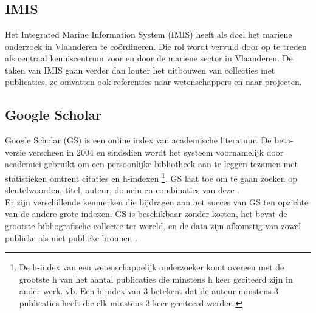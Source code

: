 \chapter{}%
\label{ch:stand-van-zaken}


\section{IMIS}
Het Integrated Marine Information System (IMIS) \autocite{Haspeslagh2024} heeft als doel het mariene onderzoek in Vlaanderen te coördineren. Die rol wordt vervuld door op te treden als centraal kenniscentrum voor en door de mariene sector in Vlaanderen. De taken van IMIS gaan verder dan louter het uitbouwen van collecties met publicaties, ze omvatten ook referenties naar wetenschappers en naar projecten.
\section{Google Scholar}
Google Scholar (GS) is een online index van academische literatuur. De beta-versie verscheen in 2004 en sindsdien wordt het systeem voornamelijk door academici gebruikt om een persoonlijke bibliotheek aan te leggen tezamen met statistieken omtrent citaties en h-indexen \footnote{De h-index van een wetenschappelijk onderzoeker komt overeen met de grootste h van het aantal publicaties die minstens h keer geciteerd zijn in ander werk. vb. Een h-index van 3 betekent dat de auteur minstens 3 publicaties heeft die elk minstens 3 keer geciteerd werden.}. GS laat toe om te gaan zoeken op sleutelwoorden, titel, auteur, domein en combinaties van deze \autocite{Noruzi2005}.\\
Er zijn verschillende kenmerken die bijdragen aan het succes van GS ten opzichte van de andere grote indexen. GS is beschikbaar zonder kosten, het bevat de grootste bibliografische collectie ter wereld, en de data zijn afkomstig van zowel publieke als niet publieke bronnen \autocite{Aguillo2011}.

